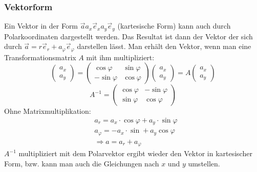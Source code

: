 \documentclass[a4paper,10pt]{scrartcl}
\begin{document}
        \subsubsection{Vektorform}
        Ein Vektor in der Form \(\vec{a} a_x\vec{e}_x a_y\vec{e}_y\) (kartesische Form) kann auch durch Polarkoordinaten dargestellt werden.
        Das Resultat ist dann der Vektor der sich durch \(\vec{a} = r\vec{e}_r + a_{\varphi}\vec{e}_{\varphi} \) darstellen lässt. Man erhält den
        Vektor, wenn man eine Transformationsmatrix \(A\) mit ihm multipliziert: 
        \begin{equation*}
            \begin{pmatrix} a_x \\ a_y \end{pmatrix} = \begin{pmatrix} \cos \varphi & \sin \varphi \\ 
                -\sin \varphi & \cos \varphi  \end{pmatrix} 
                \begin{pmatrix} a_x \\ a_y \end{pmatrix} = 
                A \begin{pmatrix} a_x \\ a_y \end{pmatrix}
        \end{equation*}
        \begin{equation*}
            A^{-1} = \begin{pmatrix} \cos \varphi & -\sin \varphi \\ 
                \sin \varphi & \cos \varphi  \end{pmatrix}
        \end{equation*}
        Ohne Matrixmultiplikation: 
        \begin{equation*}
            \begin{aligned}
                & a_r = a_x \cdot \cos \varphi + a_y \cdot \sin \varphi \\
                & a_{\varphi} = -a_x \cdot \sin + a_y \cos \varphi \\
                & \Rightarrow a = a_r + a_{\varphi}
            \end{aligned}
        \end{equation*}
        \(A^{-1}\) multipliziert mit dem Polarvektor ergibt wieder den Vektor in kartesischer Form, bzw. kann man auch die Gleichungen nach \(x\) und 
        \(y\) umstellen.
\end{document}
